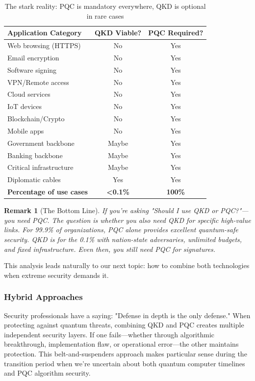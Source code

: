 \documentclass[11pt,a4paper]{article}
\newtheorem{remark}{Remark}
\begin{document}
\begin{table}[h]
\centering
\begin{tabular}{|l|c|c|}
\hline
\textbf{Application Category} & \textbf{QKD Viable?} & \textbf{PQC Required?} \\
\hline
Web browsing (HTTPS) & No & Yes \\
Email encryption & No & Yes \\
Software signing & No & Yes \\
VPN/Remote access & No & Yes \\
Cloud services & No & Yes \\
IoT devices & No & Yes \\
Blockchain/Crypto & No & Yes \\
Mobile apps & No & Yes \\
Government backbone & Maybe & Yes \\
Banking backbone & Maybe & Yes \\
Critical infrastructure & Maybe & Yes \\
Diplomatic cables & Yes & Yes \\
\hline
\textbf{Percentage of use cases} & \textbf{<0.1\%} & \textbf{100\%} \\
\hline
\end{tabular}
\caption{The stark reality: PQC is mandatory everywhere, QKD is optional in rare cases}
\end{table}

\begin{remark}[The Bottom Line]
If you're asking "Should I use QKD or PQC?"---you need PQC. The question is whether you \emph{also} need QKD for specific high-value links. For 99.9\% of organizations, PQC alone provides excellent quantum-safe security. QKD is for the 0.1\% with nation-state adversaries, unlimited budgets, and fixed infrastructure. Even then, you still need PQC for signatures.
\end{remark}

This analysis leads naturally to our next topic: how to combine both technologies when extreme security demands it.

\subsubsection{Hybrid Approaches}

Security professionals have a saying: "Defense in depth is the only defense." When protecting against quantum threats, combining QKD and PQC creates multiple independent security layers. If one fails---whether through algorithmic breakthrough, implementation flaw, or operational error---the other maintains protection. This belt-and-suspenders approach makes particular sense during the transition period when we're uncertain about both quantum computer timelines and PQC algorithm security.
\end{document}
